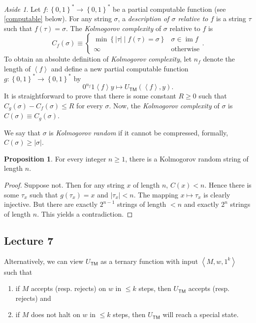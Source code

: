 \documentclass[10pt,letterpaper,cm]{nupset}
\theoremstyle{definition}
\theoremstyle{theorem}
\newtheorem{prop}[definition]{Proposition}
\theoremstyle{remark}
\newtheorem*{aside}{Aside}
\newcommand{\1}{\mathbf{1}}
\newcommand{\0}{\vec 0}
\DeclareMathOperator{\im}{im}
\DeclareMathOperator{\TM}{\mathsf{TM}}
\begin{document}
\begin{aside}
Let  $f:\left\{0,1\right\}^{\ast} \to\left\{0,1\right\}^{\ast}$ be a partial computable function (see \cref{computable} below). For any string $\sigma$, a \textit{description of $\sigma$ relative to $f$} is a string $\tau$ such that $f(\tau) = \sigma$. The \textit{Kolmogorov complexity} of $\sigma$ relative to $f$ is
\[
C_f(\sigma ) \equiv  \begin{cases}
\min\left\{\left\lvert{\tau}\right\rvert \mid f(\tau) = \sigma\right\} & \sigma \in \im{f}
\\ \infty & \text{otherwise}
\end{cases}.
\] To obtain an absolute definition of \textit{Kolmogorov complexity}, let $n_f$ denote the length of $\left\langle f\right\rangle$ and define a new partial computable function $g: \left\{0,1\right\}^{\ast} \to\left\{0,1\right\}^{\ast}$ by
\[
0^{n_f}1\left\langle f\right\rangle y \mapsto U_{\TM}(\left\langle f\right\rangle, y).
\] It is straightforward to prove that there is some constant $R\geq 0$ such that $C_g(\sigma) - C_f(\sigma) \leq R$ for every $\sigma$. Now, the \textit{Kolmogorov complexity} of $\sigma$ is $C(\sigma) \equiv C_g(\sigma)$.

\smallskip

We say that $\sigma$ is \textit{Kolmogorov random} if it cannot be compressed, formally, $C(\sigma) \geq \left\lvert{\sigma}\right\rvert$.

\begin{prop}
For every integer $n\geq 1$, there is a Kolmogorov random string of length $n$.
\end{prop}
\begin{proof}
Suppose not. Then for any string $x$ of length $n$, $C(x) < n$.  Hence there is some $\tau_x$ such that $g(\tau_x) = x$ and $\left\lvert{\tau_x}\right\rvert < n$. The mapping $x \mapsto \tau_x$ is clearly injective. But there are exactly $2^{n-1}$ strings of length $< n$ and exactly $2^n$ strings of length $n$. This yields a contradiction.
\end{proof}
\end{aside}


\subsection{Lecture 7}


Alternatively, we can view $U_{\TM}$ as a ternary function with input $\left\langle M, w, 1^k \right\rangle$ such that
\begin{enumerate}[label=(\roman*)]
\item if $M$ accepts (resp. rejects) on $w$ in $\leq k$ steps, then $U_{\TM}$ accepts (resp. rejects) and
\item if $M$ does not halt on $w$ in $\leq k$ steps, then $U_{\TM}$ will reach a special state.
\end{enumerate}
\end{document}
